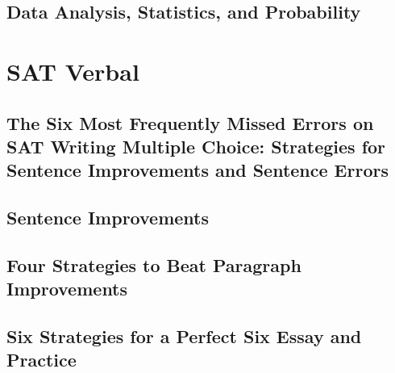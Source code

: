 \documentclass[12pt]{book}
\begin{document}
\chapter{Data Analysis, Statistics, and Probability}
	
	
	
	

\part{SAT Verbal}

\chapter{The Six Most Frequently Missed Errors on SAT Writing Multiple Choice: Strategies for Sentence Improvements and Sentence Errors}
	
	
	
	
	
	
	
	
	
	
	
	

\chapter{Sentence Improvements}
	
	
	
	
	

\chapter{Four Strategies to Beat Paragraph Improvements}
	
	
	
	
	
	

\chapter{Six Strategies for a Perfect Six Essay and Practice}
	
	
	
	
	
	
	
	
\end{document}
